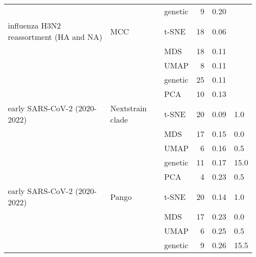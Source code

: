 \begin{tabular}{lllrrl}
                                        &                    & genetic &               9 &                           0.20 &           \\
influenza H3N2 reassortment (HA and NA) &                MCC &   t-SNE &              18 &                           0.06 &           \\
                                        &                    &     MDS &              18 &                           0.11 &           \\
                                        &                    &    UMAP &               8 &                           0.11 &           \\
                                        &                    & genetic &              25 &                           0.11 &           \\
                                        &                    &     PCA &              10 &                           0.13 &           \\
           early SARS-CoV-2 (2020-2022) &   Nextstrain clade &   t-SNE &              20 &                           0.09 &       1.0 \\
                                        &                    &     MDS &              17 &                           0.15 &       0.0 \\
                                        &                    &    UMAP &               6 &                           0.16 &       0.5 \\
                                        &                    & genetic &              11 &                           0.17 &      15.0 \\
                                        &                    &     PCA &               4 &                           0.23 &       0.5 \\
           early SARS-CoV-2 (2020-2022) &              Pango &   t-SNE &              20 &                           0.14 &       1.0 \\
                                        &                    &     MDS &              17 &                           0.23 &       0.0 \\
                                        &                    &    UMAP &               6 &                           0.25 &       0.5 \\
                                        &                    & genetic &               9 &                           0.26 &      15.5 \\

\end{tabular}
